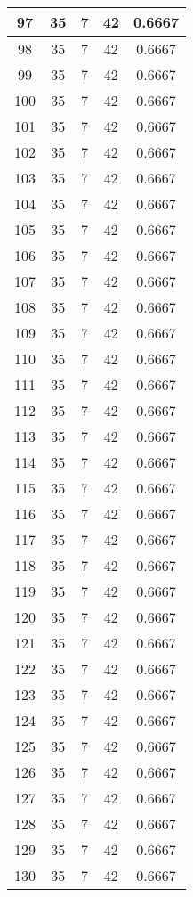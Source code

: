 \documentclass[letterpaper, 12pt]{article}
\begin{document}
\begin{longtable}{|c|c|c|c|c|}
\hline
97 & 35 & 7 & 42 & 0.6667 \\
\hline
98 & 35 & 7 & 42 & 0.6667 \\
\hline
99 & 35 & 7 & 42 & 0.6667 \\
\hline
100 & 35 & 7 & 42 & 0.6667 \\
\hline
101 & 35 & 7 & 42 & 0.6667 \\
\hline
102 & 35 & 7 & 42 & 0.6667 \\
\hline
103 & 35 & 7 & 42 & 0.6667 \\
\hline
104 & 35 & 7 & 42 & 0.6667 \\
\hline
105 & 35 & 7 & 42 & 0.6667 \\
\hline
106 & 35 & 7 & 42 & 0.6667 \\
\hline
107 & 35 & 7 & 42 & 0.6667 \\
\hline
108 & 35 & 7 & 42 & 0.6667 \\
\hline
109 & 35 & 7 & 42 & 0.6667 \\
\hline
110 & 35 & 7 & 42 & 0.6667 \\
\hline
111 & 35 & 7 & 42 & 0.6667 \\
\hline
112 & 35 & 7 & 42 & 0.6667 \\
\hline
113 & 35 & 7 & 42 & 0.6667 \\
\hline
114 & 35 & 7 & 42 & 0.6667 \\
\hline
115 & 35 & 7 & 42 & 0.6667 \\
\hline
116 & 35 & 7 & 42 & 0.6667 \\
\hline
117 & 35 & 7 & 42 & 0.6667 \\
\hline
118 & 35 & 7 & 42 & 0.6667 \\
\hline
119 & 35 & 7 & 42 & 0.6667 \\
\hline
120 & 35 & 7 & 42 & 0.6667 \\
\hline
121 & 35 & 7 & 42 & 0.6667 \\
\hline
122 & 35 & 7 & 42 & 0.6667 \\
\hline
123 & 35 & 7 & 42 & 0.6667 \\
\hline
124 & 35 & 7 & 42 & 0.6667 \\
\hline
125 & 35 & 7 & 42 & 0.6667 \\
\hline
126 & 35 & 7 & 42 & 0.6667 \\
\hline
127 & 35 & 7 & 42 & 0.6667 \\
\hline
128 & 35 & 7 & 42 & 0.6667 \\
\hline
129 & 35 & 7 & 42 & 0.6667 \\
\hline
130 & 35 & 7 & 42 & 0.6667 \\

\end{longtable}
\end{document}
